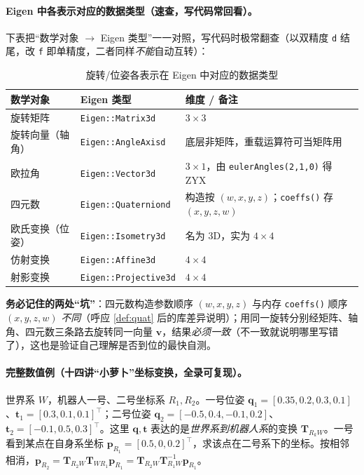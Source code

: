 \paragraph{Eigen 中各表示对应的数据类型（速查，写代码常回看）。}下表把“数学对象 $\to$ Eigen 类型”一一对照，写代码时极常翻查（以双精度 \texttt{d} 结尾，改 \texttt{f} 即单精度，二者同样\emph{不能}自动互转）\cite{gaoxiang2019slam14}：
\begin{table}[H]\centering\small
\caption{旋转/位姿各表示在 Eigen 中对应的数据类型}
\label{tab:rb-eigen-types}
\begin{tabular}{lll}
\toprule
数学对象 & Eigen 类型 & 维度 / 备注 \\
\midrule
旋转矩阵 & \texttt{Eigen::Matrix3d} & $3\times3$ \\
旋转向量（轴角） & \texttt{Eigen::AngleAxisd} & 底层非矩阵，重载运算符可当矩阵用 \\
欧拉角 & \texttt{Eigen::Vector3d} & $3\times1$，由 \texttt{eulerAngles(2,1,0)} 得 ZYX \\
四元数 & \texttt{Eigen::Quaterniond} & 构造按 $(w,x,y,z)$；\texttt{coeffs()} 存 $(x,y,z,w)$ \\
欧氏变换（位姿） & \texttt{Eigen::Isometry3d} & 名为 3D，实为 $4\times4$ \\
仿射变换 & \texttt{Eigen::Affine3d} & $4\times4$ \\
射影变换 & \texttt{Eigen::Projective3d} & $4\times4$ \\
\bottomrule
\end{tabular}
\end{table}
\noindent\textbf{务必记住的两处“坑”}：四元数构造参数顺序 $(w,x,y,z)$ 与内存 \texttt{coeffs()} 顺序 $(x,y,z,w)$ \emph{不同}（呼应 \cref{def:quat} 后的库差异说明）；用同一旋转分别经矩阵、轴角、四元数三条路去旋转同一向量 $\mathbf{v}$，结果\emph{必须一致}（不一致就说明哪里写错了），这也是验证自己理解是否到位的最快自测。

\paragraph{完整数值例（十四讲“小萝卜”坐标变换，全录可复现）。}世界系 $W$，机器人一号、二号坐标系 $R_1,R_2$。一号位姿 $\mathbf{q}_1=[0.35,0.2,0.3,0.1]$、$\mathbf{t}_1=[0.3,0.1,0.1]^\top$；二号位姿 $\mathbf{q}_2=[-0.5,0.4,-0.1,0.2]$、$\mathbf{t}_2=[-0.1,0.5,0.3]^\top$。这里 $\mathbf{q},\mathbf{t}$ 表达的是\emph{世界系到机器人系}的变换 $\mathbf{T}_{R_kW}$。一号看到某点在自身系坐标 $\mathbf{p}_{R_1}=[0.5,0,0.2]^\top$，求该点在二号系下的坐标。按相邻相消，$\mathbf{p}_{R_2}=\mathbf{T}_{R_2W}\mathbf{T}_{WR_1}\mathbf{p}_{R_1}=\mathbf{T}_{R_2W}\mathbf{T}_{R_1W}^{-1}\mathbf{p}_{R_1}$。

